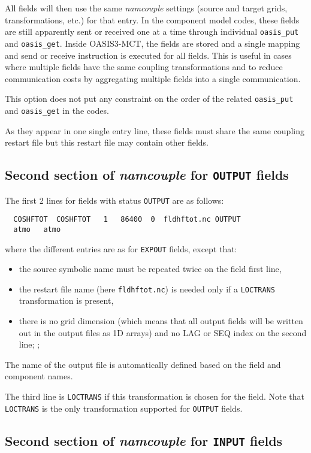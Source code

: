 All fields will then use the same
{\it namcouple} settings (source and target grids, transformations, etc.) for that entry. In the component model codes,
these fields are still apparently sent or received one at a
time through individual {\tt oasis\_put} and {\tt oasis\_get}. Inside OASIS3-MCT, the fields are stored and a single mapping
and send or receive instruction is executed for all fields. This is
useful in cases where multiple fields have the same coupling
transformations and to reduce communication costs by aggregating multiple 
fields into a single communication. 

This option does not put any constraint
on the order of the related {\tt oasis\_put} and {\tt oasis\_get} in the codes.

As they appear in one single entry line, these fields must share the same coupling restart file 
but this restart file may contain other fields.

\subsection{Second section of {\it namcouple} for {\tt OUTPUT} fields}
\label{subsubsec_secondOUTPUT}
The first 2 lines for fields with status {\tt OUTPUT} are as follows:
  \begin{verbatim}
  COSHFTOT  COSHFTOT   1   86400  0  fldhftot.nc OUTPUT 
  atmo   atmo 
\end{verbatim}
where the different entries are as for {\tt EXPOUT} fields, except
that:
\begin{itemize}
\item the source symbolic name must be repeated twice on the field
  first line,
\item the restart file name (here {\tt fldhftot.nc}) is needed only if
  a {\tt LOCTRANS} transformation is present,
\item there is no grid dimension (which means that all output
    fields will be written out in the output files as 1D arrays) and no LAG or SEQ
  index on the second line; ;
\end{itemize}
The name of the output file is automatically defined based on the
field and component names.

The third line is {\tt LOCTRANS} if this transformation is chosen for
the field. Note that {\tt LOCTRANS} is the only transformation
supported for {\tt OUTPUT} fields.

\subsection{Second section of {\it namcouple} for {\tt INPUT} fields}
\label{subsubsec_secondINPUT}

